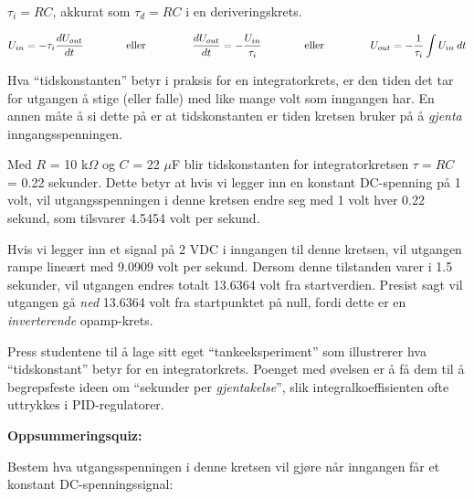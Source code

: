 





$\tau_i = RC$, akkurat som $\tau_d = RC$ i en deriveringskrets.

$$U_{in} = -\tau_i {dU_{out} \over dt} \hbox{\hskip 40pt eller \hskip 40pt} {dU_{out} \over dt} = -{U_{in} \over \tau_i} \hbox{\hskip 40pt eller \hskip 40pt} U_{out} = -{1 \over {\tau_i}} \int U_{in} \> dt$$

Hva ``tidskonstanten'' betyr i praksis for en integratorkrets, er den tiden det tar for utgangen å stige (eller falle) med like mange volt som inngangen har. En annen måte å si dette på er at tidskonstanten er tiden kretsen bruker på å {\it gjenta} inngangsspenningen.







Med $R$ = 10 k$\Omega$ og $C$ = 22 $\mu$F blir tidskonstanten for integratorkretsen $\tau = RC$ = 0.22 sekunder. Dette betyr at hvis vi legger inn en konstant DC-spenning på 1 volt, vil utgangsspenningen i denne kretsen endre seg med 1 volt hver 0.22 sekund, som tilsvarer 4.5454 volt per sekund.

Hvis vi legger inn et signal på 2 VDC i inngangen til denne kretsen, vil utgangen rampe lineært med 9.0909 volt per sekund. Dersom denne tilstanden varer i 1.5 sekunder, vil utgangen endres totalt 13.6364 volt fra startverdien. Presist sagt vil utgangen gå {\it ned} 13.6364 volt fra startpunktet på null, fordi dette er en {\it inverterende} opamp-krets.

\vskip 10pt

Press studentene til å lage sitt eget ``tankeeksperiment'' som illustrerer hva ``tidskonstant'' betyr for en integratorkrets. Poenget med øvelsen er å få dem til å begrepsfeste ideen om ``sekunder per {\it gjentakelse}'', slik integralkoeffisienten ofte uttrykkes i PID-regulatorer.









\vfil \eject

\noindent
{\bf Oppsummeringsquiz:}

Bestem hva utgangsspenningen i denne kretsen vil gjøre når inngangen får et konstant DC-spenningssignal:

